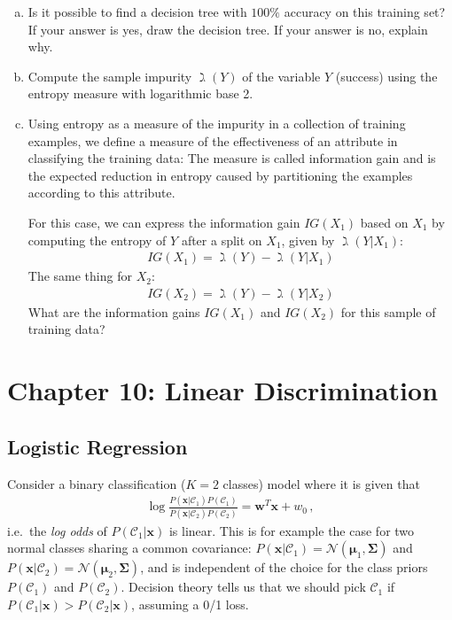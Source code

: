 \documentclass[11pt,a4paper]{article}
\begin{document}
\begin{enumerate}[(a)]
\item Is it possible to find a decision tree with $100\%$ accuracy on this training set? If your answer is yes, draw the decision tree. If your answer is no, explain why.
\item Compute the sample impurity $\gimel(Y)$ of the variable $Y$ (success) using the entropy measure with logarithmic base 2.
\item Using entropy as a measure of the impurity in a collection of training examples, we define a measure of the effectiveness of an attribute in classifying the training data: The measure is called information gain and is the expected reduction in entropy caused by partitioning the examples according to this attribute.

For this case, we can express the information gain $IG(X_{1})$ based on $X_{1}$ by computing the entropy of $Y$ after a split on $X_{1}$, given by $\gimel(Y|X_{1})$:
\begin{align*}
  		IG(X_{1}) = \gimel(Y) - \gimel(Y|X_{1})
  	\end{align*}
The same thing for $X_{2}$:
\begin{align*}
  		IG(X_{2}) = \gimel(Y) - \gimel(Y|X_{2})
  	\end{align*}
What are the information gains $IG(X_{1})$ and $IG(X_{2})$ for this sample of training data?
\end{enumerate}

\section{Chapter 10: Linear Discrimination}
\subsection{Logistic Regression}
Consider a binary classification ($K=2$ classes) model where it is given that
\begin{align}
  \log\frac{P(\mathbf{x}|\mathcal{C}_1)P(\mathcal{C}_1)}{P(\mathbf{x}|\mathcal{C}_2)P(\mathcal{C}_2)} = \mathbf{w}^T\mathbf{x} + w_0 \,,
  \label{eq:logodds}
\end{align}
i.e.~the \textit{log odds} of $P(\mathcal{C}_1|\mathbf{x})$ is linear. This is for example the case for two normal classes sharing a common covariance: $P(\mathbf{x}|\mathcal{C}_1)=\mathcal{N}(\boldsymbol{\mu}_1,\boldsymbol{\Sigma})$ and $P(\mathbf{x}|\mathcal{C}_2)=\mathcal{N}(\boldsymbol{\mu}_2,\boldsymbol{\Sigma})$, and is independent of the choice for the class priors $P(\mathcal{C}_1)$ and $P(\mathcal{C}_2)$. Decision theory tells us that we should pick $\mathcal{C}_1$ if $P(\mathcal{C}_1|\mathbf{x})>P(\mathcal{C}_2|\mathbf{x})$, assuming a 0/1 loss.
\end{document}
